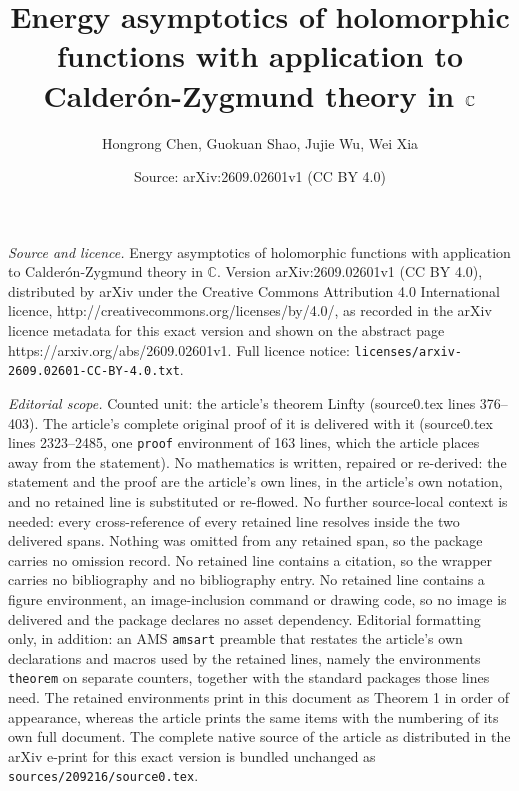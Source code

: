 \documentclass[10pt,a4paper]{amsart}
\title{Energy asymptotics of holomorphic functions with application to Calder\'{o}n-Zygmund theory in $\C$}
\author{Hongrong Chen, Guokuan Shao, Jujie Wu, Wei Xia}
\date{Source: arXiv:2609.02601v1 (CC BY 4.0)}
\newcommand{\C}{\ensuremath{\mathbb{C}}}
\begin{document}
\maketitle

\noindent\emph{Source and licence.} Energy asymptotics of holomorphic functions with application to Calder\'{o}n-Zygmund theory in $\C$. Version arXiv:2609.02601v1 (CC BY 4.0), distributed by arXiv under the Creative Commons Attribution 4.0 International licence, http://creativecommons.org/licenses/by/4.0/, as recorded in the arXiv licence metadata for this exact version and shown on the abstract page https://arxiv.org/abs/2609.02601v1. Full licence notice: \texttt{licenses/arxiv-2609.02601-CC-BY-4.0.txt}.\par\smallskip

\noindent\textit{Editorial scope.} Counted unit: the article's theorem Linfty (source0.tex lines 376--403). The article's complete original proof of it is delivered with it (source0.tex lines 2323--2485, one \texttt{proof} environment of 163 lines, which the article places away from the statement). No mathematics is written, repaired or re-derived: the statement and the proof are the article's own lines, in the article's own notation, and no retained line is substituted or re-flowed.  No further source-local context is needed: every cross-reference of every retained line resolves inside the two delivered spans.  Nothing was omitted from any retained span, so the package carries no omission record.  No retained line contains a citation, so the wrapper carries no bibliography and no bibliography entry.  No retained line contains a figure environment, an image-inclusion command or drawing code, so no image is delivered and the package declares no asset dependency.  Editorial formatting only, in addition: an AMS \texttt{amsart} preamble that restates the article's own declarations and macros used by the retained lines, namely the environments \texttt{theorem} on separate counters, together with the standard packages those lines need.  The retained environments print in this document as Theorem 1 in order of appearance, whereas the article prints the same items with the numbering of its own full document.  The complete native source of the article as distributed in the arXiv e-print for this exact version is bundled unchanged as \texttt{sources/209216/source0.tex}.
\end{document}
